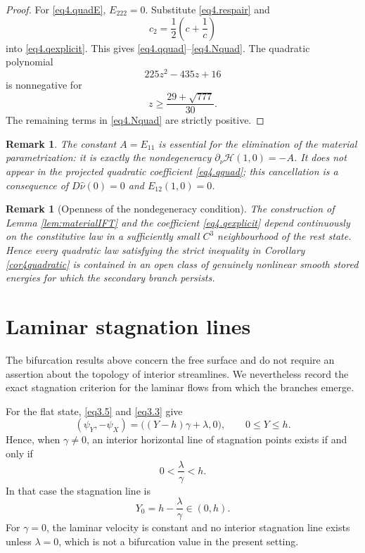 \documentclass[12pt]{article}
\numberwithin{equation}{section}
\newtheorem{remark}[theorem]{Remark}
\numberwithin{equation}{section}
\begin{document}
\begin{proof}
For \eqref{eq4.quadE}, $E_{222}=0$.  Substitute
\eqref{eq4.respair} and
\[
c_2=\frac12\left(c+\frac1c\right)
\]
into \eqref{eq4.qexplicit}.  This gives
\eqref{eq4.qquad}--\eqref{eq4.Nquad}.  The quadratic polynomial
\[
225z^2-435z+16
\]
is nonnegative for
\[
z\ge\frac{29+\sqrt{777}}{30}.
\]
The remaining terms in \eqref{eq4.Nquad} are strictly positive.
\end{proof}

\begin{remark}
The constant $A=E_{11}$ is essential for the elimination of the material parametrization:
it is exactly the nondegeneracy $\partial_\nu\mathscr H(1,0)=-A$.  It does not appear
in the projected quadratic coefficient \eqref{eq4.qquad}; this cancellation is a
consequence of $D\widehat\nu(0)=0$ and $E_{12}(1,0)=0$.
\end{remark}

\begin{remark}[Openness of the nondegeneracy condition]
The construction of Lemma \ref{lem:materialIFT} and the coefficient
\eqref{eq4.qexplicit} depend continuously on the constitutive law in a sufficiently
small $C^3$ neighbourhood of the rest state.  Hence every quadratic law satisfying
the strict inequality in Corollary \ref{cor4quadratic} is contained in an open class
of genuinely nonlinear smooth stored energies for which the secondary branch persists.
\end{remark}

\section{Laminar stagnation lines}
The bifurcation results above concern the free surface and do not require an assertion about the topology of interior streamlines. We nevertheless record the exact stagnation criterion for the laminar flows from which the branches emerge.

For the flat state, \eqref{eq3.5} and \eqref{eq3.3} give
\begin{equation}\label{eq5.1}
(\psi_Y,-\psi_X)=\bigl((Y-h)\gamma+\lambda,0\bigr),
\qquad 0\le Y\le h.
\end{equation}
Hence, when $\gamma\neq0$, an interior horizontal line of stagnation points exists if and only if
\begin{equation}\label{eq5.2}
0<\frac{\lambda}{\gamma}<h.
\end{equation}
In that case the stagnation line is
\begin{equation}\label{eq5.3}
Y_0=h-\frac{\lambda}{\gamma}\in(0,h).
\end{equation}
For $\gamma=0$, the laminar velocity is constant and no interior stagnation line exists unless $\lambda=0$, which is not a bifurcation value in the present setting.
\end{document}

